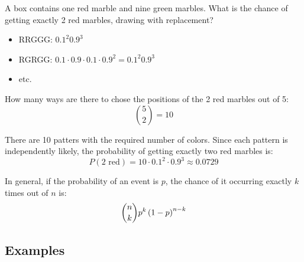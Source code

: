 \documentclass[letterpaper, landscape]{exam}
\begin{document}
  A box contains one red marble and nine green marbles. What is the chance of
  getting exactly 2 red marbles, drawing with replacement?

  \begin{itemize}
    \item RRGGG\@: $0.1^2 0.9^3$
    \item RGRGG\@: $0.1 \cdot 0.9 \cdot 0.1 \cdot 0.9^2 = 0.1^2 0.9^3$
    \item etc.
  \end{itemize}

  How many ways are there to chose the positions of the 2 red marbles out of 5:
  \[
    \binom{5}{2} = 10
  \]

  There are 10 patters with the required number of colors. Since each pattern is
  independently likely, the probability of getting exactly two red marbles is:
  \[
    P(\text{2 red}) = 10 \cdot 0.1^2 \cdot 0.9^3 \approx \boxed{ 0.0729 }
  \]

  In general, if the probability of an event is $p$, the chance of it occurring
  exactly $k$ times out of $n$ is:
  \[
    \binom{n}{k} p^k \del{ 1 - p }^{n - k}
  \]

  \subsection{Examples}
  
\end{document}
